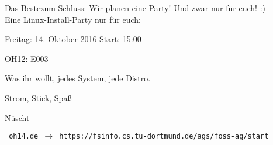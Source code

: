 \begin{frame}{Das Beste}{zum Schluss:}
	Wir planen eine Party! Und zwar nur für euch! :)\\
	Eine Linux-Install-Party nur für euch:\\ 
	\begin{center}
	\begin{description}[<+->]
		\item[Wann?] Freitag: 14. Oktober 2016 Start: 15:00
		\item[Wo?] OH12: E003
		\item[Was?] Was ihr wollt, jedes System, jede Distro.
		\item[Womit?] Strom, Stick, Spaß    
		\item[Koscht?] Nüscht
	\end{description}
	\end{center}

	{\onslide<5-> \texttt{  oh14.de $\rightarrow$ https://fsinfo.cs.tu-dortmund.de/ags/foss-ag/start}}
\end{frame}
